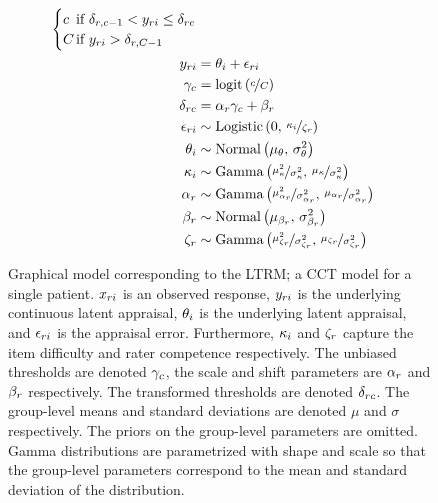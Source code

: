 \documentclass[a4paper,usenames,dvipsnames]{article}
\begin{document}
\begin{figure}[!ht]
\begin{minipage}{0.5\textwidth}
{\begin{align*}
\begin{cases}
			\Incat	&\hspace{-.3cm} \text{if } \Threshold_{\Irater, \Incat-1} < \Appraisal_{\Irater\Iitem} \leq \Threshold_{\Irater\Incat} \\
			\Tncat	&\hspace{-.3cm} \text{if } \Appraisal_{\Irater\Iitem} > \Threshold_{\Irater, \Tncat-1}
			\end{cases}\\
			\Appraisal_{\Irater\Iitem} &\assignment \ItemTruth_\Iitem + \Error_{\Irater\Iitem}\\
			\UnBiasedThreshold_\Incat &\assignment \logit{\nicefrac{\Incat}{\Tncat}}\\
			\Threshold_{\Irater\Incat} &\assignment \RaterScale_\Irater \gamma_\Incat + \RaterShift_\Irater\\
			\Error_{\Irater\Iitem}   &\sim \dlogis{0}{\nicefrac{\ItemDifficulty_\Iitem}{\RaterCompetence_\Irater}} \\
			\ItemTruth_\Iitem        &\sim \dnorm{\mu_\ItemTruth}{\sigma_\ItemTruth^2}\\
			\ItemDifficulty_\Iitem   &\sim \dgammaMV{\mu_\ItemDifficulty}{\sigma_\ItemDifficulty^2} \\
			\RaterScale_\Irater      &\sim \dgammaMV{\mu_{\RaterScale_\Irater}}{\sigma_{\RaterScale_\Irater}^2} \\
			\RaterShift_\Irater      &\sim \dnorm{\mu_{\RaterShift_\Irater}}{\sigma_{\RaterShift_\Irater}^2} \\
			\RaterCompetence_\Irater &\sim \dgammaMV{\mu_{\RaterCompetence_\Irater}}{\sigma_{\RaterCompetence_\Irater}^2} \\
		\end{align*}
		}%
	\end{minipage}
	\caption{Graphical model corresponding to the LTRM; a CCT model for a single patient. $x_{ri}$ is an observed response, $y_{ri}$ is the underlying continuous latent appraisal, $\theta_i$ is the underlying latent appraisal, and $\epsilon_{ri}$ is the appraisal error. Furthermore, $\kappa_i$ and $\zeta_r$ capture the item difficulty and rater competence respectively. The unbiased thresholds are denoted $\gamma_c$, the scale and shift parameters are $\alpha_r$ and $\beta_r$ respectively. The transformed thresholds are denoted $\delta_{rc}$. The group-level means and standard deviations are denoted $\mu$ and $\sigma$ respectively. The priors on the group-level parameters are omitted. Gamma distributions are parametrized with shape and scale so that the group-level parameters correspond to the mean and standard deviation of the distribution.}
	\label{model:LTRM}
\end{figure}
\end{document}
